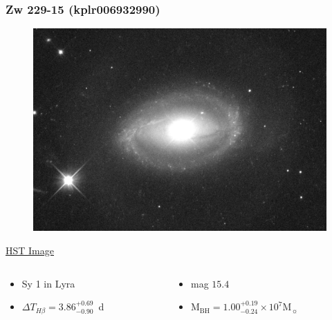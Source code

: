 \documentclass[hyperref={pdfpagelabels=false}]{beamer}
\begin{document}
\begin{frame}
\frametitle{Zw 229-15 (kplr006932990)}
  \begin{figure}
    \includegraphics[scale=0.035]{images/Zw229-15_Crop.jpg}
  \end{figure}
  \begin{center}
    \href{https://archive.stsci.edu/}{{\tiny HST Image}}
  \end{center}
  \begin{columns}
    \begin{column}{0.5\textwidth}
      \begin{itemize}
        \item Sy 1 in Lyra
        \item $\Delta T_{H\beta} = 3.86^{+0.69}_{-0.90}$~d
      \end{itemize}
    \end{column}
    \begin{column}{0.5\textwidth}
      \begin{itemize}
        \item mag $15.4$
        \item $\mathrm{M}_{\mathrm{BH}} = 1.00^{+0.19}_{-0.24} \times 10^{7} \mathrm{M}_{\sun}$
      \end{itemize}
    \end{column}
  \end{columns}
  \begin{center}
    {\tiny \citep{Barth11}}
  \end{center}
\end{frame}
\end{document}
